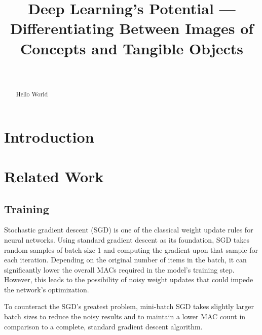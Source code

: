 \documentclass[conference]{IEEEtran}
\title{Deep Learning’s Potential --- Differentiating Between Images of Concepts
and Tangible Objects}
\author{%
    \IEEEauthorblockN{Pratik Bhusal}
    \IEEEauthorblockA{%
        pratik.bhusal@utdallas.edu\\
        \today
    }\\

    \IEEEauthorblockN{Max Xie}
    \IEEEauthorblockA{%
        max.xie@utdallas.edu\\
        \today
    }
}
\begin{document}
\maketitle

\begin{abstract} %


Hello World
\end{abstract} %



\section{Introduction} %





\section{Related Work} %




\subsection{Training}\label{miniBatchSGD} %


Stochastic gradient descent (SGD) is one of the classical weight update rules
for neural networks. Using standard gradient descent as its foundation, SGD
takes random samples of batch size 1 and computing the gradient upon that sample
for each iteration. Depending on the original number of items in the batch, it
can significantly lower the overall MACs required in the model's training
step. However, this leads to the possibility of noisy weight updates that could
impede the network's optimization.

To counteract the SGD's greatest problem, mini-batch SGD takes slightly larger
batch sizes to reduce the noisy results and to maintain a lower MAC count in
comparison to a complete, standard gradient descent algorithm.
\end{document}
